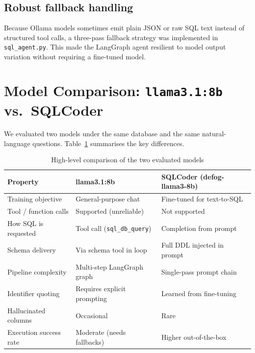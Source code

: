 \documentclass[12pt,a4paper]{article}
\begin{document}
\subsection{Robust fallback handling}

Because Ollama models sometimes emit plain JSON or raw SQL text instead of structured
tool calls, a three-pass fallback strategy was implemented in \texttt{sql\_agent.py}.
This made the LangGraph agent resilient to model output variation without requiring
a fine-tuned model.

\section{Model Comparison: \texttt{llama3.1:8b} vs.\ SQLCoder}

We evaluated two models under the same database and the same natural-language questions.
Table~\ref{tab:model_comparison} summarises the key differences.

\begin{table}[H]
\centering
\caption{High-level comparison of the two evaluated models}
\label{tab:model_comparison}
\renewcommand{\arraystretch}{1.4}
\begin{tabular}{lll}
\toprule
\textbf{Property} & \textbf{llama3.1:8b} & \textbf{SQLCoder (defog-llama3-8b)} \\
\midrule
Training objective     & General-purpose chat       & Fine-tuned for text-to-SQL \\
Tool / function calls  & Supported (unreliable)     & Not supported \\
How SQL is requested   & Tool call (\texttt{sql\_db\_query}) & Completion from prompt \\
Schema delivery        & Via schema tool in loop    & Full DDL injected in prompt \\
Pipeline complexity    & Multi-step LangGraph graph & Single-pass prompt chain \\
Identifier quoting     & Requires explicit prompting & Learned from fine-tuning \\
Hallucinated columns   & Occasional                 & Rare \\
Execution success rate & Moderate (needs fallbacks) & Higher out-of-the-box \\
\bottomrule
\end{tabular}
\end{table}
\end{document}

